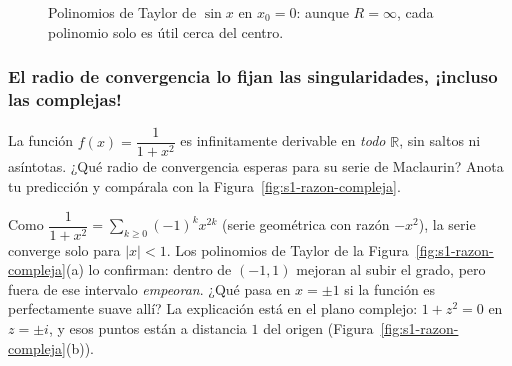 \begin{figure}[H]
\centering
{}
\caption{Polinomios de Taylor de $\sin x$ en $x_0=0$: aunque $R=\infty$, cada polinomio solo es útil cerca del centro.}
\label{fig:s1-taylor-sin}
\end{figure}
 
\subsubsection*{El radio de convergencia lo fijan las singularidades, ¡incluso las complejas!}
 
\begin{activity}
La función $f(x)=\dfrac{1}{1+x^2}$ es infinitamente derivable en \emph{todo} $\mathbb{R}$, sin saltos ni asíntotas. ¿Qué radio de convergencia esperas para su serie de Maclaurin? Anota tu predicción y compárala con la Figura~\ref{fig:s1-razon-compleja}.
\end{activity}
 
Como $\dfrac{1}{1+x^2}=\sum_{k\ge 0}(-1)^k x^{2k}$ (serie geométrica con razón $-x^2$), la serie converge solo para $|x|<1$. Los polinomios de Taylor de la Figura~\ref{fig:s1-razon-compleja}(a) lo confirman: dentro de $(-1,1)$ mejoran al subir el grado, pero fuera de ese intervalo \emph{empeoran}. ¿Qué pasa en $x=\pm 1$ si la función es perfectamente suave allí? La explicación está en el plano complejo: $1+z^2=0$ en $z=\pm i$, y esos puntos están a distancia $1$ del origen (Figura~\ref{fig:s1-razon-compleja}(b)).
 
